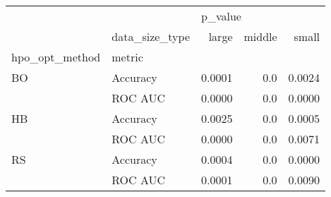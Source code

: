 \begin{tabular}{llrrr}
\toprule
   & {} & \multicolumn{3}{l}{p\_value} \\
   & data\_size\_type &   large & middle &   small \\
hpo\_opt\_method & metric &         &        &         \\
\midrule
BO & Accuracy &  0.0001 &    0.0 &  0.0024 \\
   & ROC AUC &  0.0000 &    0.0 &  0.0000 \\
HB & Accuracy &  0.0025 &    0.0 &  0.0005 \\
   & ROC AUC &  0.0000 &    0.0 &  0.0071 \\
RS & Accuracy &  0.0004 &    0.0 &  0.0000 \\
   & ROC AUC &  0.0001 &    0.0 &  0.0090 \\
\bottomrule
\end{tabular}
